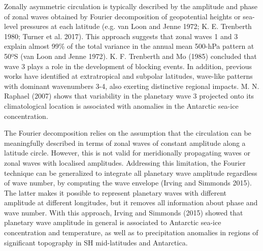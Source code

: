 \documentclass[smallextended]{svjour3}       %
\begin{document}
Zonally asymmetric circulation is typically described by the amplitude and phase of zonal waves obtained by Fourier decomposition of geopotential heights or sea-level pressures at each latitude (e.g. van Loon and Jenne 1972; K. E. Trenberth 1980; Turner et al. 2017).
This approach suggests that zonal waves 1 and 3 explain almost 99\% of the total variance in the annual mean 500-hPa pattern at 50ºS (van Loon and Jenne 1972).
K. F. Trenberth and Mo (1985) concluded that wave 3 plays a role in the development of blocking events.
In addition, previous works have identified at extratropical and subpolar latitudes, wave-like patterns with dominant wavenumbers 3-4, also exerting distinctive regional impacts.
M. N. Raphael (2007) shows that variability in the planetary wave 3 projected onto its climatological location is associated with anomalies in the Antarctic sea-ice concentration.

The Fourier decomposition relies on the assumption that the circulation can be meaningfully described in terms of zonal waves of constant amplitude along a latitude circle.
However, this is not valid for meridionally propagating waves or zonal waves with localised amplitudes.
Addressing this limitation, the Fourier technique can be generalized to integrate all planetary wave amplitude regardless of wave number, by computing the wave envelope (Irving and Simmonds 2015).
The latter makes it possible to represent planetary waves with different amplitude at different longitudes, but it removes all information about phase and wave number.
With this approach, Irving and Simmonds (2015) showed that planetary wave amplitude in general is associated to Antarctic sea-ice concentration and temperature, as well as to precipitation anomalies in regions of significant topography in SH mid-latitudes and Antarctica.
\end{document}
